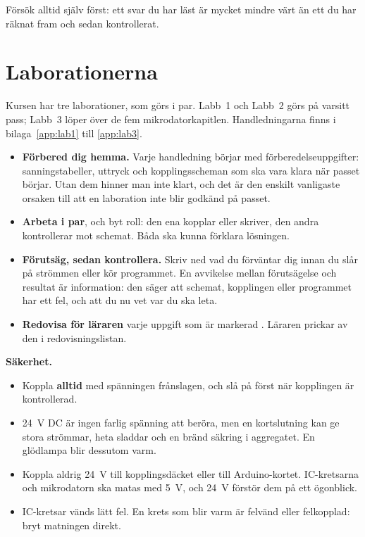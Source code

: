 Försök alltid själv först: ett svar du har läst är mycket mindre värt än ett du har räknat fram
och sedan kontrollerat.

\section*{Laborationerna}
Kursen har tre laborationer, som görs i par. Labb~1 och Labb~2 görs på varsitt pass; Labb~3 löper
över de fem mikrodatorkapitlen. Handledningarna finns i bilaga~\ref{app:lab1} till
\ref{app:lab3}.
\begin{itemize}
  \item \textbf{Förbered dig hemma.} Varje handledning börjar med förberedelseuppgifter:
    sanningstabeller, uttryck och kopplingsscheman som ska vara klara när passet börjar. Utan dem
    hinner man inte klart, och det är den enskilt vanligaste orsaken till att en laboration inte
    blir godkänd på passet.
  \item \textbf{Arbeta i par}, och byt roll: den ena kopplar eller skriver, den andra kontrollerar
    mot schemat. Båda ska kunna förklara lösningen.
  \item \textbf{Förutsäg, sedan kontrollera.} Skriv ned vad du förväntar dig innan du slår på
    strömmen eller kör programmet. En avvikelse mellan förutsägelse och resultat är information:
    den säger att schemat, kopplingen eller programmet har ett fel, och att du nu vet var du ska
    leta.
  \item \textbf{Redovisa för läraren} varje uppgift som är markerad .
    Läraren prickar av den i redovisningslistan.
\end{itemize}

\begin{warning}
\textbf{Säkerhet.}
\begin{itemize}
  \item Koppla \textbf{alltid} med spänningen frånslagen, och slå på först när kopplingen är
    kontrollerad.
  \item 24~V DC är ingen farlig spänning att beröra, men en kortslutning kan ge stora strömmar,
    heta sladdar och en bränd säkring i aggregatet. En glödlampa blir dessutom varm.
  \item Koppla aldrig 24~V till kopplingsdäcket eller till Arduino-kortet. IC-kretsarna och
    mikrodatorn ska matas med 5~V, och 24~V förstör dem på ett ögonblick.
  \item IC-kretsar vänds lätt fel. En krets som blir varm är felvänd eller felkopplad: bryt
    matningen direkt.
\end{itemize}
\end{warning}

